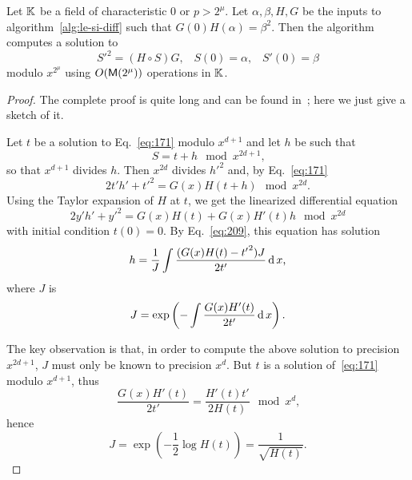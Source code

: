 \begin{theorem}
  Let $\mathbb{K}$ be a field of characteristic $0$ or $p>2^\mu$. Let
  $\alpha,\beta,H,G$ be the inputs to algorithm~\ref{alg:le-si-diff}
  such that $G(0)H(\alpha)=\beta^2$. Then the algorithm computes a
  solution to
  \begin{equation}
    \label{eq:171}
    {S'}^2 = (H\circ S)G
    \text{,}\quad
    S(0) = \alpha
    \text{,}\quad
    S'(0) = \beta
  \end{equation}
  modulo $x^{2^\mu}$ using $O(\mathsf{M}(2^{\mu}))$ operations in $\mathbb{K}$.
\end{theorem}
\begin{proof}
  The complete proof is quite long and can be found
  in~\cite{lercier+sirvent08}; here we just give a sketch of it.

  Let $t$ be a solution to Eq.~\eqref{eq:171} modulo $x^{d+1}$ and let
  $h$ be such that 
  \begin{equation}
    \label{eq:175}
    S = t + h \mod x^{2d+1}
    \text{,}
  \end{equation}
  so that $x^{d+1}$ divides $h$.  Then $x^{2d}$ divides ${h'}^2$ and,
  by Eq.~\eqref{eq:171}
  \begin{equation}
    \label{eq:176}
    2t'h' + {t'}^2 = G(x)H(t+h) \mod x^{2d}
    \text{.}
  \end{equation}
  Using the Taylor expansion of $H$ at $t$, we get the linearized
  differential equation
  \begin{equation}
    \label{eq:177}
    2y'h' + {y'}^2 = G(x)H(t) + G(x)H'(t)h
    \mod x^{2d}
  \end{equation}
  with initial condition $t(0)=0$. By Eq.~\eqref{eq:209}, this
  equation has solution
  \begin{equation}
    \label{eq:178}
    h = \frac{1}{J} \int \frac{(G(x)H(t) - {t'}^2)J}{2t'}\operatorname{d} x
    \text{,}
  \end{equation}
  where $J$ is 
  \begin{equation}
    \label{eq:179}
    J=\exp\left(-\int\frac{G(x)H'(t)}{2t'}\operatorname{d} x\right)
    \text{.}
  \end{equation}

  The key observation is that, in order to compute the above solution
  to precision $x^{2d+1}$, $J$ must only be known to precision
  $x^d$. But $t$ is a solution of~\eqref{eq:171} modulo $x^{d+1}$, thus 
  \begin{equation}
    \label{eq:172}
    \frac{G(x)H'(t)}{2t'} = \frac{H'(t)t'}{2H(t)} \mod x^d
    \text{,}
  \end{equation}
  hence
  \begin{equation}
    \label{eq:173}
    J = \exp\left(-\frac{1}{2}\log H(t)\right) = \frac{1}{\sqrt{H(t)}}
    \text{.}
  \end{equation}


\end{proof}
